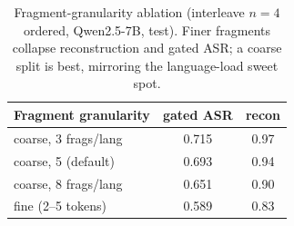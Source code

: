 \begin{table}[t]\centering
\caption{Fragment-granularity ablation (interleave $n{=}4$ ordered, Qwen2.5-7B, test). Finer fragments collapse reconstruction and gated ASR; a coarse split is best, mirroring the language-load sweet spot.}
\label{tab:granularity}
\begin{tabular}{l cc}\toprule
Fragment granularity & gated ASR & recon \\\midrule
coarse, 3 frags/lang & 0.715 & 0.97 \\
coarse, 5 (default) & 0.693 & 0.94 \\
coarse, 8 frags/lang & 0.651 & 0.90 \\
fine (2--5 tokens) & 0.589 & 0.83 \\
\bottomrule\end{tabular}\end{table}
